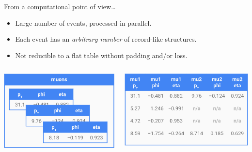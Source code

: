 \documentclass[aspectratio=169]{beamer}
\begin{document}
\begin{frame}{From a computational point of view\ldots}
\Large
\vspace{0.25 cm}
\begin{itemize}
\item Large number of events, processed in parallel.
\item Each event has an {\it arbitrary number} of record-like structures.
\item Not reducible to a flat table without padding and/or loss.
\end{itemize}

\vspace{0.25 cm}
\begin{columns}
\includegraphics[width=\linewidth]{muons-as-objects.png}

\includegraphics[width=\linewidth]{muons-as-a-table.png}
\end{columns}
\end{frame}
\end{document}
